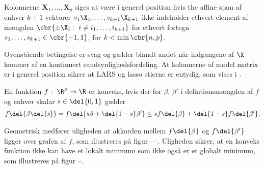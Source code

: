 \begin{defn} \label{defn:general_position}
Kolonnerne \(\mathbf{X}_1, \ldots, \mathbf{X}_p\) siges at være i generel position hvis the affine span af enhver \(k+1\) vektorer \(s_1 \X_1, \ldots, s_{k+1} \X_{k+1}\) ikke indeholder ethvert element af mængden \(\cbr{\pm \X_i : \ i \neq i_1, \ldots, i_{k+1}}\) for ethvert fortegn \(s_1, \ldots, s_{k+1} \in \cbr{-1,1}\), for \(k < \min \cbr{n,p}\). 
\end{defn}
Ovenstående betingelse er svag og gælder blandt andet når indgangene af \(\X\) kommer af en kontinuert sandsynlighedsfordeling.
At kolonnerne af model matrix er i generel position sikrer at LARS og lasso stierne er entydig, som vises i \citep{lasso_unique}.


\begin{defn}[Konveks] \label{defn:konveks}
En funktion \(f: \ \R^p \rightarrow \R\) er konveks, hvis der for \(\beta\), \(\beta'\) i defintionsmængden af \(f\) og enhver skalar \(s \in \del{0,1}\) gælder
\begin{align*}
f \del{\beta \del{s}} = f \del{s \beta + \del{1-s} \beta'} \leq s f\del{\beta} + \del{1-s} f\del{\beta'}.
\end{align*}
\end{defn}
Geometrisk medfører uligheden at akkorden mellem \(f \del{\beta}\) og  \(f \del{\beta'}\) ligger over grafen af \(f\), som illustreres på figur ---.
Uligheden sikrer, at en konveks funktion ikke kan have et lokalt minimum som ikke også er et globalt minimum, som illustreres på figur --.

%
%
